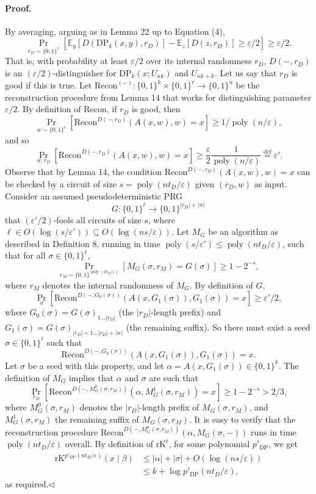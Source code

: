 \paragraph{Proof.} By averaging, arguing as in Lemma 22 up to Equation (4),
\[\Pr_{r_D\sim\{0,1\}^s}[\mathbb E_y[D(\mathrm{DP}_k(x,y),r_D)]-\mathbb E_z[D(z,r_D)]\geq\varepsilon/2]\geq\varepsilon/2.\tag{5}\]
That is, with probability at least $\varepsilon/2$ over its internal randomness $r_D$, $D(-,r_D)$ is an $(\varepsilon/2)$-distinguisher for $\mathrm{DP}_k(x;U_{nk})$ and $U_{nk+k}$. Let us say that $r_D$ is good if this is true.
Let $\mathrm{Recon}^{(-)}:\{0,1\}^k\times\{0,1\}^r\to\{0,1\}^n$ be the reconstruction procedure from Lemma 14 that works for distinguishing parameter $\varepsilon/2$. By definition of Recon, if $r_D$ is good, then
\[\Pr_{w\sim\{0,1\}^r}[\mathrm{Recon}^{D(-,r_D)}(A(x,w),w)=x]\geq1/\operatorname{poly}(n/\varepsilon),\]
and so
\[\Pr_{w,r_D}[\mathrm{Recon}^{D(-,r_D)}(A(x,w),w)=x]\geq\frac\varepsilon2\frac1{\operatorname{poly}(n/\varepsilon)}\stackrel{\mathrm{def}}=\varepsilon'.\]
Observe that by Lemma 14, the condition $\mathrm{Recon}^{D(-,r_D)}(A(x,w),w)=x$ can be checked by a circuit of size $s=\operatorname{poly}(nt_D/\varepsilon)$ given $(r_D,w)$ as input. Consider an assumed pseudodeterministic PRG
\[G:\{0,1\}^\ell\to\{0,1\}^{|r_D|+|w|}\]
that $(\varepsilon'/2)$-fools all circuits of size $s$, where $\ell\in O(\log(s/\varepsilon'))\subseteq O(\log(ns/\varepsilon))$. Let $M_G$ be an algorithm as described in Definition 8, running in time $\operatorname{poly}(s/\varepsilon')\leq\operatorname{poly}(nt_D/\varepsilon)$, such that for all $\sigma\in\{0,1\}^\ell$,
\[\Pr_{r_M\sim\{0,1\}^{\operatorname{poly}(nt_D/\varepsilon)}}[M_G(\sigma,r_M)=G(\sigma)]\geq1-2^{-s},\]
where $r_M$ denotes the internal randomness of $M_G$. By definition of $G$,
\[\Pr_\sigma[\mathrm{Recon}^{D(-,G_0(\sigma))}(A(x,G_1(\sigma)),G_1(\sigma))=x]\geq\varepsilon'/2,\]
where $G_0(\sigma)=G(\sigma)_{1\ldots|r_D|}$ (the $|r_D|$-length prefix) and $G_1(\sigma)=G(\sigma)_{|r_D|+1\ldots|r_D|+|w|}$ (the remaining suffix). So there must exist a seed $\sigma\in\{0,1\}^\ell$ such that
\[\mathrm{Recon}^{D(-,G_0(\sigma))}(A(x,G_1(\sigma)),G_1(\sigma))=x.\]
Let $\sigma$ be a seed with this property, and let $\alpha=A(x,G_1(\sigma))\in\{0,1\}^k$. The definition of $M_G$ implies that $\alpha$ and $\sigma$ are such that
\[\Pr_{r_M}[\mathrm{Recon}^{D(-,M_G^0(\sigma,r_M))}(\alpha,M_G^1(\sigma,r_M))=x]\geq1-2^{-s}>2/3,\]
where $M_G^0(\sigma,r_M)$ denotes the $|r_D|$-length prefix of $M_G(\sigma,r_M)$, and $M_G^1(\sigma,r_M)$ the remaining suffix of $M_G(\sigma,r_M)$. It is easy to verify that the reconstruction procedure $\mathrm{Recon}^{D(-,M_G^0(\sigma,r_M))}(\alpha,M_G(\sigma,-))$ runs in time $\operatorname{poly}(nt_D/\varepsilon)$ overall. By definition of $\mathrm{rK}^t$, for some polynomial $p'_{\mathrm{DP}}$, we get
\begin{align*}
\mathrm{rK}^{p'_{\mathrm{DP}}(nt_D/\varepsilon)}(x\mid\beta)&\leq|\alpha|+|\sigma|+O(\log(ns/\varepsilon))\\
&\leq k+\log p'_{\mathrm{DP}}(nt_D/\varepsilon),
\end{align*}
as required.\hfill$\triangleleft$
